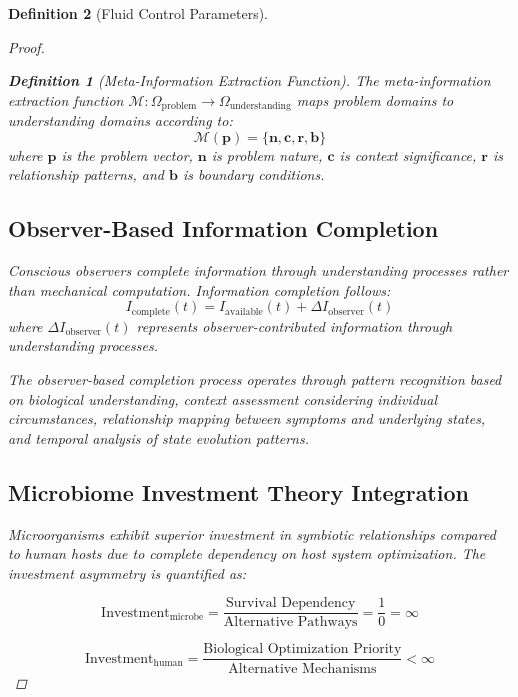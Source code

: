 \documentclass[12pt,a4paper]{article}
\newtheorem{definition}{Definition}
\begin{document}
\begin{definition}[Fluid Control Parameters]
\begin{proof}
\begin{definition}[Meta-Information Extraction Function]
The meta-information extraction function $\mathcal{M}: \Omega_{\text{problem}} \to \Omega_{\text{understanding}}$ maps problem domains to understanding domains according to:
\begin{equation}
\mathcal{M}(\mathbf{p}) = \{\mathbf{n}, \mathbf{c}, \mathbf{r}, \mathbf{b}\}
\end{equation}
where $\mathbf{p}$ is the problem vector, $\mathbf{n}$ is problem nature, $\mathbf{c}$ is context significance, $\mathbf{r}$ is relationship patterns, and $\mathbf{b}$ is boundary conditions.
\end{definition}

\subsection{Observer-Based Information Completion}

Conscious observers complete information through understanding processes rather than mechanical computation. Information completion follows:
\begin{equation}
I_{\text{complete}}(t) = I_{\text{available}}(t) + \Delta I_{\text{observer}}(t)
\end{equation}
where $\Delta I_{\text{observer}}(t)$ represents observer-contributed information through understanding processes.

The observer-based completion process operates through pattern recognition based on biological understanding, context assessment considering individual circumstances, relationship mapping between symptoms and underlying states, and temporal analysis of state evolution patterns.

\subsection{Microbiome Investment Theory Integration}

Microorganisms exhibit superior investment in symbiotic relationships compared to human hosts due to complete dependency on host system optimization. The investment asymmetry is quantified as:

\begin{equation}
\text{Investment}_{\text{microbe}} = \frac{\text{Survival Dependency}}{\text{Alternative Pathways}} = \frac{1}{0} = \infty
\end{equation}

\begin{equation}
\text{Investment}_{\text{human}} = \frac{\text{Biological Optimization Priority}}{\text{Alternative Mechanisms}} < \infty
\end{equation}


\end{proof}
\end{definition}
\end{document}
